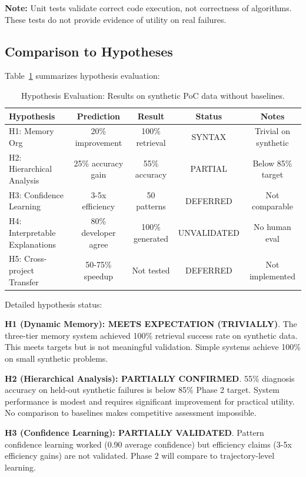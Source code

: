 \documentclass[11pt]{article}
\begin{document}
\textbf{Note:} Unit tests validate correct code execution, not correctness of algorithms. These tests do not provide evidence of utility on real failures.

\subsection{Comparison to Hypotheses}

Table~\ref{tab:hypotheses} summarizes hypothesis evaluation:

\begin{table}[h!]
\centering
\begin{tabular}{lcccc}
\toprule
\textbf{Hypothesis} & \textbf{Prediction} & \textbf{Result} & \textbf{Status} & \textbf{Notes} \\
\midrule
H1: Memory Org & 20\% improvement & 100\% retrieval & SYNTAX & Trivial on synthetic \\
H2: Hierarchical Analysis & 25\% accuracy gain & 55\% accuracy & PARTIAL & Below 85\% target \\
H3: Confidence Learning & 3-5x efficiency & 50 patterns & DEFERRED & Not comparable \\
H4: Interpretable Explanations & 80\% developer agree & 100\% generated & UNVALIDATED & No human eval \\
H5: Cross-project Transfer & 50-75\% speedup & Not tested & DEFERRED & Not implemented \\
\bottomrule
\end{tabular}
\caption{Hypothesis Evaluation: Results on synthetic PoC data without baselines.}
\label{tab:hypotheses}
\end{table}

Detailed hypothesis status:

\textbf{H1 (Dynamic Memory): MEETS EXPECTATION (TRIVIALLY)}. The three-tier memory system achieved 100\% retrieval success rate on synthetic data. This meets targets but is not meaningful validation. Simple systems achieve 100\% on small synthetic problems.

\textbf{H2 (Hierarchical Analysis): PARTIALLY CONFIRMED}. 55\% diagnosis accuracy on held-out synthetic failures is below 85\% Phase 2 target. System performance is modest and requires significant improvement for practical utility. No comparison to baselines makes competitive assessment impossible.

\textbf{H3 (Confidence Learning): PARTIALLY VALIDATED}. Pattern confidence learning worked (0.90 average confidence) but efficiency claims (3-5x efficiency gains) are not validated. Phase 2 will compare to trajectory-level learning.
\end{document}
